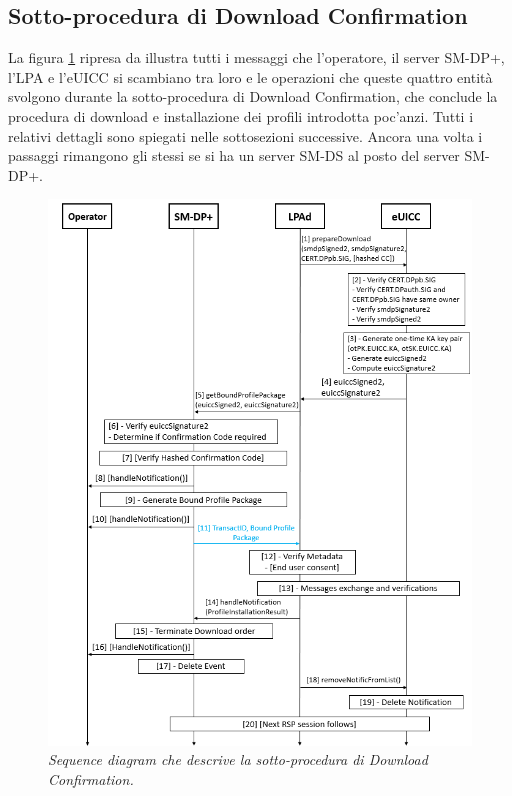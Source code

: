 \documentclass[10pt, oneside]{book}
\begin{document}
\subsection{Sotto-procedura di Download Confirmation}\label{sec:down-confirm}
La figura \ref{fig:download-confirmation} ripresa da \cite{GSMA-docs-new} illustra tutti i messaggi che l'operatore, il server SM-DP+, l'LPA e l'eUICC si scambiano tra loro e le operazioni che queste quattro entità svolgono durante la sotto-procedura di Download Confirmation, che conclude la procedura di download e installazione dei profili introdotta poc'anzi. Tutti i relativi dettagli \cite{GSMA-docs-new} sono spiegati nelle sottosezioni successive. Ancora una volta i passaggi rimangono gli stessi se si ha un server SM-DS al posto del server SM-DP+.
\begin{figure}
\includegraphics[width=\linewidth]{download-confirmation.png}
\caption{\textit{Sequence diagram che descrive la sotto-procedura di Download Confirmation.}}
\label{fig:download-confirmation}
\end{figure}
\end{document}

